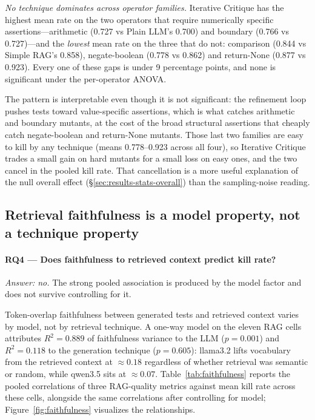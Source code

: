 \documentclass[smallextended]{svjour3}
\begin{document}
\emph{No technique dominates across operator families.} Iterative
Critique has the highest mean rate on the two operators that require
numerically specific assertions---arithmetic (0.727 vs Plain LLM's
0.700) and boundary (0.766 vs 0.727)---and the \emph{lowest} mean
rate on the three that do not: comparison (0.844 vs Simple RAG's
0.858), negate-boolean (0.778 vs 0.862) and return-None (0.877 vs
0.923). Every one of these gaps is under 9 percentage points, and
none is significant under the per-operator ANOVA.

The pattern is interpretable even though it is not significant: the
refinement loop pushes tests toward value-specific assertions, which
is what catches arithmetic and boundary mutants, at the cost of the
broad structural assertions that cheaply catch negate-boolean and
return-None mutants. Those last two families are easy to kill by any
technique (means 0.778--0.923 across all four), so Iterative Critique
trades a small gain on hard mutants for a small loss on easy ones,
and the two cancel in the pooled kill rate. That cancellation is a
more useful explanation of the null overall effect
(\S\ref{sec:results-stats-overall}) than the sampling-noise reading.

\subsection{Retrieval faithfulness is a model property, not a
technique property}\label{sec:results-faithfulness}

\paragraph{\textnormal{\textbf{RQ4} --- Does faithfulness to retrieved context predict kill rate?}}
\emph{Answer: no.} The strong pooled association is produced by
the model factor and does not survive controlling for it.


Token-overlap faithfulness between generated tests and retrieved
context varies by model, not by retrieval technique. A one-way model on
the eleven RAG cells attributes $R^2 = 0.889$ of faithfulness
variance to the LLM ($p = 0.001$) and $R^2 = 0.118$ to the
generation technique ($p = 0.605$): llama3.2 lifts vocabulary from the
retrieved context at $\approx 0.18$ regardless of whether retrieval
was semantic or random, while qwen3.5 sits at $\approx 0.07$.
Table~\ref{tab:faithfulness} reports the pooled correlations of
three RAG-quality metrics against mean kill rate across these cells,
alongside the same correlations after controlling for model;
Figure~\ref{fig:faithfulness} visualizes the relationships.
\end{document}
